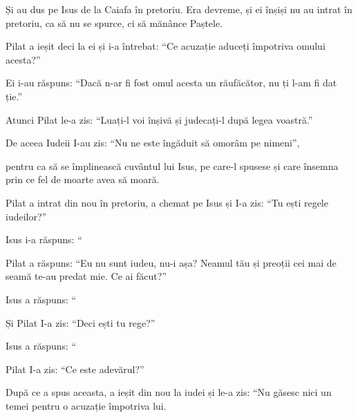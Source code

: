 {\par }{\PP {}Și au dus pe Isus de la Caiafa în pretoriu. Era devreme, și ei înșiși nu au intrat în pretoriu, ca să nu se spurce, ci să mănânce Paștele.

Pilat a ieșit deci la ei și i-a întrebat: “Ce acuzație aduceți împotriva omului acesta?”


\par }{\PP {}Ei i-au răspuns: “Dacă n-ar fi fost omul acesta un răufăcător, nu ți l-am fi dat ție.”


\par }{\PP {}Atunci Pilat le-a zis: “Luați-l voi înșivă și judecați-l după legea voastră.”

\par }{\PP De aceea Iudeii I-au zis: “Nu ne este îngăduit să omorâm pe nimeni”,

pentru ca să se împlinească cuvântul lui Isus, pe care-l spusese și care însemna prin ce fel de moarte avea să moară.


\par }{\PP {}Pilat a intrat din nou în pretoriu, a chemat pe Isus și I-a zis: “Tu ești regele iudeilor?”


\par }{\PP {}Isus i-a răspuns: “{}


\par }{\PP {}Pilat a răspuns: “Eu nu sunt iudeu, nu-i așa? Neamul tău și preoții cei mai de seamă te-au predat mie. Ce ai făcut?”


\par }{\PP {}Isus a răspuns: “{}


\par }{\PP {}Și Pilat I-a zis: “Deci ești tu rege?”

\par }{\PP Isus a răspuns: “{}


\par }{\PP {}Pilat I-a zis: “Ce este adevărul?”

\par }{\PP După ce a spus aceasta, a ieșit din nou la iudei și le-a zis: “Nu găsesc nici un temei pentru o acuzație împotriva lui.

}
